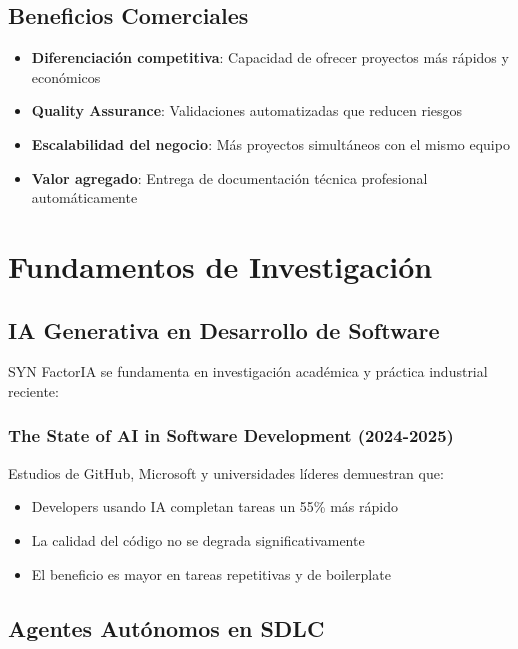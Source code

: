 \documentclass[12pt,a4paper,spanish]{article}
\begin{document}
\subsection{Beneficios Comerciales}

\begin{itemize}
    \item \textbf{Diferenciación competitiva}: Capacidad de ofrecer proyectos más rápidos y económicos
    \item \textbf{Quality Assurance}: Validaciones automatizadas que reducen riesgos
    \item \textbf{Escalabilidad del negocio}: Más proyectos simultáneos con el mismo equipo
    \item \textbf{Valor agregado}: Entrega de documentación técnica profesional automáticamente
\end{itemize}

\newpage

\section{Fundamentos de Investigación}

\subsection{IA Generativa en Desarrollo de Software}

SYN FactorIA se fundamenta en investigación académica y práctica industrial reciente:

\subsubsection{The State of AI in Software Development (2024-2025)}

Estudios de GitHub, Microsoft y universidades líderes demuestran que:

\begin{itemize}
    \item Developers usando IA completan tareas un 55\% más rápido
    \item La calidad del código no se degrada significativamente
    \item El beneficio es mayor en tareas repetitivas y de boilerplate
\end{itemize}

\subsection{Agentes Autónomos en SDLC}
\end{document}
